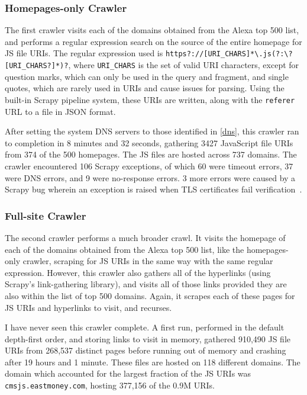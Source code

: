 \subsubsection*{Homepages-only Crawler}
The first crawler visits each of the domains obtained from the Alexa top 500 list, and performs a regular expression search on the source of the entire homepage for JS file URIs.
The regular expression used is \texttt{https?://[URI\_CHARS]*\textbackslash{}.js\allowbreak{}(?:\textbackslash{}?[URI\_CHARS?]*)?}, where \texttt{URI\_CHARS} is the set of valid URI characters, except for question marks, which can only be used in the query and fragment, and single quotes, which are rarely used in URIs and cause issues for parsing.
Using the built-in Scrapy pipeline system, these URIs are written, along with the \texttt{referer} URL to a file in JSON format.

After setting the system DNS servers to those identified in \autoref{dns}, this crawler ran to completion in 8 minutes and 32 seconds, gathering 3427 JavaScript file URIs from 374 of the 500 homepages.
The JS files are hosted across 737 domains.
The crawler encountered 106 Scrapy exceptions, of which 60 were timeout errors, 37 were DNS errors, and 9 were no-response errors.
3 more errors were caused by a Scrapy bug wherein an exception is raised when TLS certificates fail verification~\cite{Calderone2015}.
\subsubsection*{Full-site Crawler}
The second crawler performs a much broader crawl.
It visits the homepage of each of the domains obtained from the Alexa top 500 list, like the homepages-only crawler, scraping for JS URIs in the same way with the same regular expression.
However, this crawler also gathers all of the hyperlinks (using Scrapy's link-gathering library), and visits all of those links provided they are also within the list of top 500 domains.
Again, it scrapes each of these pages for JS URIs and hyperlinks to visit, and recurses.

I have never seen this crawler complete.
A first run, performed in the default depth-first order, and storing links to visit in memory, gathered 910,490 JS file URIs from 268,537 distinct pages before running out of memory and crashing after 19 hours and 1 minute.
These files are hosted on 118 different domains.
The domain which accounted for the largest fraction of the JS URIs was \texttt{cmsjs.eastmoney.com}, hosting 377,156 of the 0.9M URIs.

